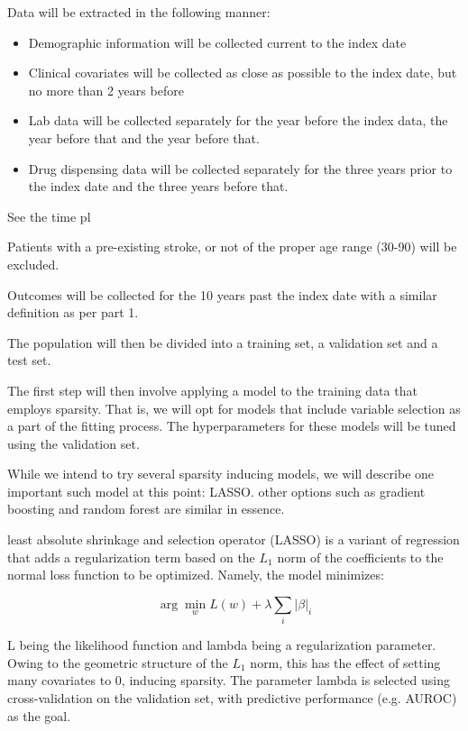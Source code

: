 \documentclass[a4paper,12pt]{article}
\begin{document}
\begin{description}
		Data will be extracted in the following manner:
		\begin{itemize}
			\item Demographic information will be collected current to the index date
			\item Clinical covariates will be collected as close as possible to the index date, but no more than 2 years before
			\item Lab data will be collected separately for the year before the index data, the year before that and the year before that.
			\item Drug dispensing data will be collected separately for the three years prior to the index date and the three years before that.
		\end{itemize}
		See the time pl
		
		Patients with a pre-existing stroke, or not of the proper age range (30-90) will be excluded.
	
		Outcomes will be collected for the 10 years past the index date with a similar definition as per part 1.
		
		The population will then be divided into a training set, a validation set and a test set.
		
		The first step will then involve applying a model to the training data that employs sparsity. That is, we will opt for models that include variable selection as a part of the fitting process. The hyperparameters for these models will be tuned using the validation set.
		
		While we intend to try several sparsity inducing models, we will describe one important such model at this point: LASSO\cite{Tibshirani2011}. other options such as gradient boosting\cite{Freund1997} and random forest\cite{Breiman2001} are similar in essence.
		
		least absolute shrinkage and selection operator (LASSO) is a variant of regression that adds a regularization term based on the $ L_1 $ norm of the coefficients to the normal loss function to be optimized. Namely, the model minimizes:
		
		\begin{equation*}
		\arg \min_w L(w) + \lambda \sum_{i}|\beta|_i
		\end{equation*}
		
		L being the likelihood function and lambda being a regularization parameter. Owing to the geometric structure of the $ L_1 $ norm, this has the effect of setting many covariates to 0, inducing sparsity. The parameter lambda is selected using cross-validation on the validation set, with predictive performance (e.g. AUROC) as the goal.
		

\end{description}
\end{document}
